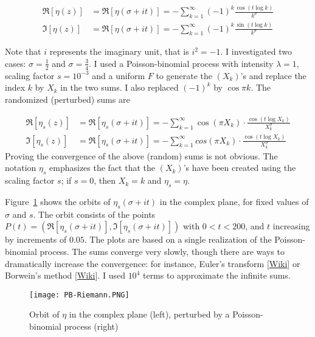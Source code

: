 \documentclass[10pt]{article}
\begin{document}
\begin{align}
 \Re[{\eta(z)}] & = \Re[{\eta(\sigma+it)}]  = - \sum_{k=1}^\infty (-1)^k \frac{\cos(t\log k)}{k^\sigma} \label{eta1} \\
 \Im[{\eta(z)}] & = \Re[{\eta(\sigma+it)}]  = - \sum_{k=1}^\infty (-1)^k \frac{\sin(t\log k)}{k^\sigma} \label{eta2}
\end{align}

Note that $i$ represents the imaginary unit, that is $i^2=-1$. I investigated two cases: $\sigma=\frac{1}{2}$ and $\sigma=\frac{3}{4}$. I used a Poisson-binomial process with intensity $\lambda=1$, scaling factor $s=10^{-3}$ and a uniform $F$ to generate the $(X_k)$'s and replace the index $k$ by $X_k$ in the two sums. I also replaced $(-1)^k$ by $\cos\pi k$. The randomized (perturbed) sums are

\begin{align}
\Re[{\eta_s(z)}]  & = \Re[{\eta_s(\sigma+it)}]  = - \sum_{k=1}^\infty \cos(\pi X_k)\cdot \frac{\cos(t\log X_k)}{X_k^\sigma}\label{eta1b} \\
 \Im[{\eta_s(z)}] & = \Re[{\eta_s(\sigma+it)}]  =- \sum_{k=1}^\infty cos(\pi X_k)\cdot \frac{\cos(t\log X_k)}{X_k^\sigma} \label{eta2b}
\end{align}
Proving the convergence of the above (random) sums is not obvious. The notation $\eta_s$ emphasizes the fact that the $(X_k)$'s have been created using the scaling factor $s$;
if $s=0$, then $X_k=k$ and $\eta_s=\eta$.

Figure~\ref{fig:riemann} shows the orbits of $\eta_s(\sigma+it)$ in the complex plane, for fixed values of $\sigma$ and $s$. The orbit consists of the points
$P(t)=(\Re[{\eta_s(\sigma+it)}],\Im[{\eta_s(\sigma+it)}])$  with $0<t<200$, and $t$ increasing by increments of $0.05$. The plots are based on a single realization of the Poisson-binomial process. The sums converge very slowly, though there are ways to dramatically increase the convergence: for instance, Euler's transform [\href{https://en.wikipedia.org/wiki/Series_acceleration}{Wiki}] or
Borwein's method [\href{https://bit.ly/3EthJXY}{Wiki}].
I used $10^4$ terms to approximate the infinite sums.

\begin{figure}[H]
\centering
\texttt{[image: PB-Riemann.PNG]}
\caption{Orbit of $\eta$ in the complex plane (left), perturbed by a Poisson-binomial process (right)}
\label{fig:riemann}
\end{figure}
\end{document}
